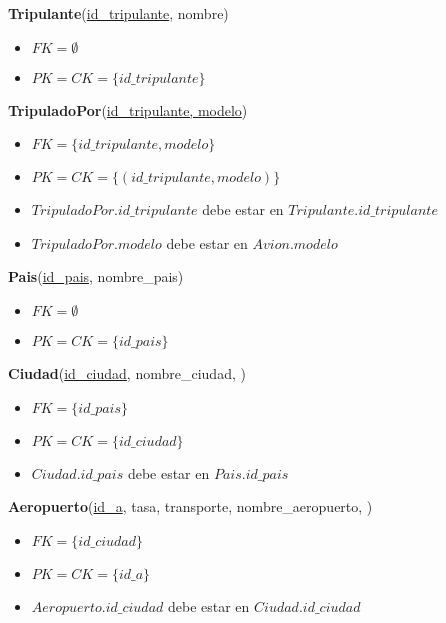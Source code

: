 \vspace*{0.1cm}
\noindent
\textbf{Tripulante}(\underline{id\_tripulante}, nombre)
\begin{itemize}[noitemsep]
	\item $FK = \emptyset$
	\item $PK = CK = \{id\_tripulante\}$
\end{itemize}

\vspace*{0.1cm}
\noindent
\textbf{TripuladoPor}(\underline{id\_tripulante, modelo})
\begin{itemize}[noitemsep]
	\item $FK = \{id\_tripulante, modelo\}$
	\item $PK = CK = \{(id\_tripulante, modelo)\}$
	\item $TripuladoPor.id\_tripulante$ debe estar en
		$Tripulante.id\_tripulante$
	\item $TripuladoPor.modelo$ debe estar en $Avion.modelo$
\end{itemize}

\vspace*{0.1cm}
\noindent
\textbf{Pais}(\underline{id\_pais}, nombre\_pais)
\begin{itemize}[noitemsep]
	\item $FK = \emptyset$
	\item $PK = CK = \{id\_pais\}$
\end{itemize}

\noindent
\textbf{Ciudad}(\underline{id\_ciudad}, nombre\_ciudad, )
\begin{itemize}[noitemsep]
	\item $FK = \{id\_pais\}$
	\item $PK = CK = \{id\_ciudad\}$
	\item $Ciudad.id\_pais$ debe estar en $Pais.id\_pais$
\end{itemize}

\vspace*{0.1cm}
\noindent
\textbf{Aeropuerto}(\underline{id\_a}, tasa, transporte, 
			nombre\_aeropuerto, )
\begin{itemize}[noitemsep]
	\item $FK = \{id\_ciudad\}$
	\item $PK = CK = \{id\_a\}$
	\item $Aeropuerto.id\_ciudad$ debe estar en $Ciudad.id\_ciudad$
\end{itemize}

  


